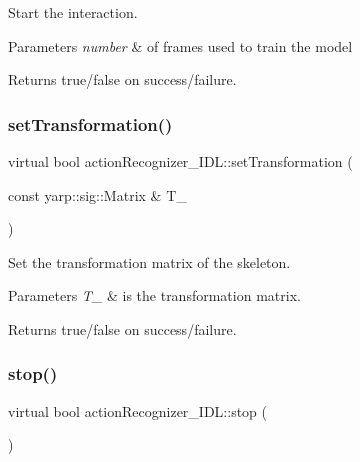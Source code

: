 Start the interaction. 


\begin{DoxyParams}{Parameters}
{\em number} & of frames used to train the model \\
\hline
\end{DoxyParams}
\begin{DoxyReturn}{Returns}
true/false on success/failure. 
\end{DoxyReturn}
\mbox{\label{classactionRecognizer__IDL_a6fab377e711dc0334dec6442dfdfec5d}} 
\subsubsection{\texorpdfstring{setTransformation()}{setTransformation()}}
{\footnotesize\ttfamily virtual bool action\+Recognizer\+\_\+\+I\+D\+L\+::set\+Transformation (\begin{DoxyParamCaption}\item[{const yarp\+::sig\+::\+Matrix \&}]{T\+\_\+ }\end{DoxyParamCaption})\hspace{0.3cm}{\ttfamily [virtual]}}



Set the transformation matrix of the skeleton. 


\begin{DoxyParams}{Parameters}
{\em T\+\_\+} & is the transformation matrix. \\
\hline
\end{DoxyParams}
\begin{DoxyReturn}{Returns}
true/false on success/failure. 
\end{DoxyReturn}
\mbox{\label{classactionRecognizer__IDL_ad1f380a935e15eece41825108b7c1e0e}} 
\subsubsection{\texorpdfstring{stop()}{stop()}}
{\footnotesize\ttfamily virtual bool action\+Recognizer\+\_\+\+I\+D\+L\+::stop (\begin{DoxyParamCaption}{ }\end{DoxyParamCaption})\hspace{0.3cm}{\ttfamily [virtual]}}



